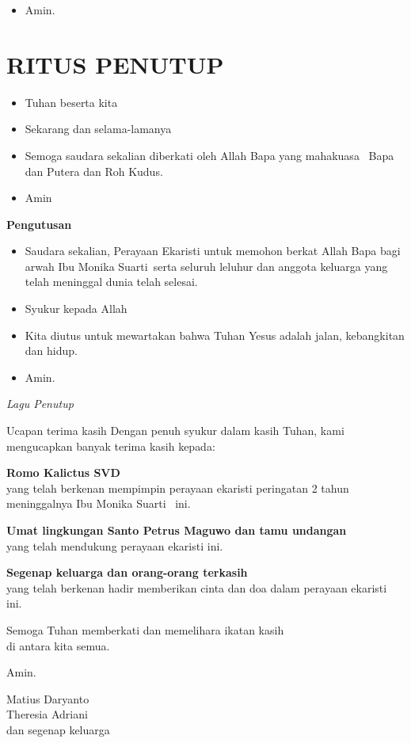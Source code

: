 \documentclass[a5paper,headsepline,titlepage,11pt,nnormalheadings,DIVcalc]{scrbook}
\makeatletter
\newcommand{\subjudul}[1]{%
  {\parindent \z@ 
    \interlinepenalty\@M \bfseries #1\par\nobreak \vskip 10\p@ }}
\newcommand{\lagu}[1]{%
  {\parindent \z@ 
    \interlinepenalty\@M \slshape \mdseries \Large \textit{#1}\par\nobreak \vskip 10\p@ }}
\newcommand{\BU}[1]{\begin{itemize} \item[U:] #1 \end{itemize}}
\newcommand{\BI}[1]{\begin{itemize} \item[I:] #1 \end{itemize}}
\newcommand{\namaalm}{Ibu Monika Suarti~}
\newcommand{\namaromo}{Kalictus SVD~}
\makeatother
\begin{document}
\BU{Amin.}

\section*{RITUS PENUTUP}

\BI{Tuhan beserta kita}

\BU{Sekarang dan selama-lamanya}

\BI{Semoga saudara sekalian diberkati oleh Allah Bapa yang 
mahakuasa \Cross ~Bapa dan Putera dan Roh Kudus.}

\BU{Amin}

 

\subjudul{Pengutusan}

\BI{Saudara sekalian, Perayaan Ekaristi untuk memohon 
berkat Allah Bapa bagi arwah \namaalm serta seluruh leluhur dan anggota keluarga yang 
telah meninggal dunia telah selesai.}

\BU{Syukur kepada Allah}

\BI{Kita diutus untuk mewartakan bahwa Tuhan Yesus adalah 
jalan, kebangkitan dan hidup.}

\BU{Amin.}

 

\lagu{Lagu Penutup}


\newpage
\begin{flushright}
{\Large Ucapan terima kasih}
\noindent Dengan penuh syukur dalam kasih Tuhan, kami mengucapkan banyak
terima kasih kepada:
\large

\textbf{Romo \namaromo}\\
yang telah berkenan mempimpin perayaan ekaristi peringatan 2 tahun meninggalnya \namaalm
ini.

\textbf{Umat lingkungan Santo Petrus Maguwo dan tamu undangan}\\
yang telah mendukung perayaan ekaristi ini.

\textbf{Segenap keluarga dan orang-orang terkasih}\\
yang telah berkenan hadir memberikan cinta dan doa dalam perayaan
ekaristi ini.

Semoga Tuhan memberkati dan memelihara ikatan kasih\\ di antara kita semua.

Amin.

\bigskip 

Matius Daryanto\\
Theresia Adriani\\
dan segenap keluarga
\end{flushright}
\end{document}
